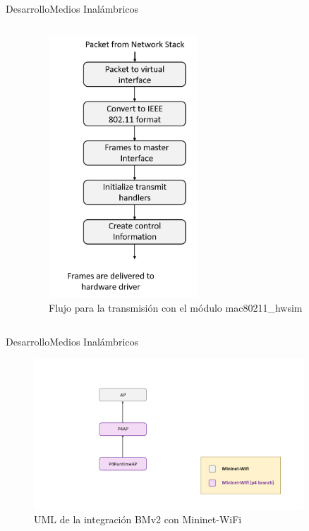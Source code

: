 \documentclass[10pt,compress,xcolor=table]{beamer} %
\begin{document}
\begin{frame}{Desarrollo}{Medios Inalámbricos}
\begin{columns}
\begin{column}{0.5\textwidth}
  \end{column}
  \vrule\hspace{0.4cm}
  \begin{column}{0.5\textwidth}  %
     \begin{figure}
      \includegraphics[width=0.52\textwidth]{img/linux_wireless_subsystem_tx.png}
      \caption{Flujo para la transmisión con el módulo mac80211\_hwsim}
      \label{fig:b}
    \end{figure}
  \end{column}
  
\end{columns}

\end{frame}

\begin{frame}{Desarrollo}{Medios Inalámbricos}

\begin{figure}
\includegraphics[width=0.9\textwidth]{img/p4_Mininet_Wifi_UML.png}
\caption{UML de la integración BMv2 con Mininet-WiFi}
\end{figure}

\end{frame}
\end{document}
